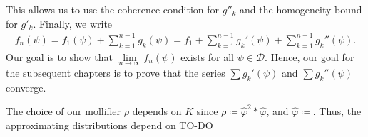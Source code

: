This allows us to use the coherence condition for \( g''_k \) and the homogeneity bound for \( g'_k \). Finally, we write
\begin{align}\label{approximating-distributions-alternative}
    f_n(\psi)= f_1(\psi) + \sum^{n-1}_{k=1} g_k(\psi) = f_1 + \sum^{n-1}_{k=1} g_k'(\psi) + \sum^{n-1}_{k=1} g_k''(\psi).
\end{align}
Our goal is to show that \(\lim\limits_{n \to \infty}f_n(\psi)\) exists for all \(\psi \in \mathcal{D}\). Hence, our goal for the subsequent chapters is to prove that the series \( \sum g_k'(\psi)\) and \( \sum g_k''(\psi)\) converge.

\begin{remark}\label{remark:fk-depends}
    The choice of our mollifier \(\rho\) depends on \(K\) since \(\rho \coloneqq \hat \varphi^2 * \hat \varphi\), and \(\hat \varphi \coloneqq \). Thus, the approximating distributions depend on TO-DO
\end{remark}

